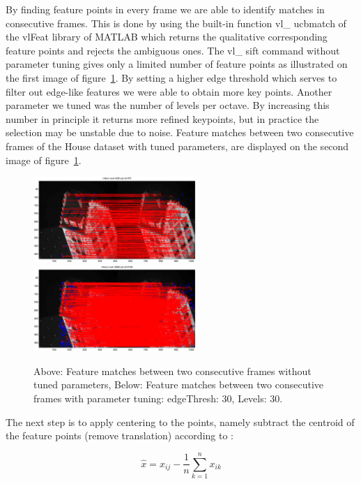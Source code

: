 By finding feature points in every frame we are able to identify matches in consecutive frames. This is done by using the built-in function vl\_ ucbmatch of the vlFeat library of MATLAB which returns the qualitative corresponding feature points and rejects the ambiguous ones. The vl\_ sift command without parameter tuning gives only a limited number of feature points as illustrated on the first image of figure~\ref{fig:matches}. By setting a higher edge threshold which serves to filter out edge-like features we were able to obtain more key points. Another parameter we tuned was the number of levels per octave. By increasing this number in principle it returns more refined keypoints, but in practice the selection may be unstable due to noise. Feature matches between two consecutive frames of the House dataset with tuned parameters, are displayed on the second image of figure~\ref{fig:matches}.

\begin{figure}[ht!]
  \centering
    \includegraphics[width=0.55\textwidth]{figures/matchesSimple.eps}\\
    \includegraphics[width=0.55\textwidth]{figures/matchesWithThresh.eps}
    \caption{Above: Feature matches between two consecutive frames without tuned parameters, Below: Feature matches between two consecutive frames with parameter tuning: edgeThresh: 30, Levels: 30.}
    \label{fig:matches}
\end{figure}

The next step is to apply centering to the points, namely subtract the centroid of the feature points (remove translation) according to :

\begin{equation}
\hat{x} = x_{ij} - \frac{1}{n} \sum_{k=1}^{n} x_{ik}
\end{equation}

